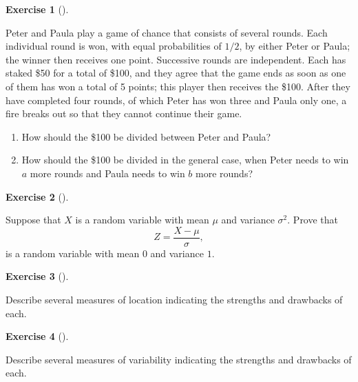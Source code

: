\documentclass[
  letterpaper,
  DIV=11,
  numbers=noendperiod]{scrreprt}
\providecommand{\tightlist}{%
  \setlength{\itemsep}{0pt}\setlength{\parskip}{0pt}}\usepackage{longtable,booktabs,array}
\theoremstyle{definition}
\newtheorem{exercise}{Exercise}[chapter]
\theoremstyle{definition}
\theoremstyle{definition}
\theoremstyle{remark}
\begin{document}
\begin{exercise}[]\protect\hypertarget{exr-6.5}{}\label{exr-6.5}

Peter and Paula play a game of chance that consists of several rounds.
Each individual round is won, with equal probabilities of \(1/2\), by
either Peter or Paula; the winner then receives one point. Successive
rounds are independent. Each has staked \$50 for a total of \$100, and
they agree that the game ends as soon as one of them has won a total of
5 points; this player then receives the \$100. After they have completed
four rounds, of which Peter has won three and Paula only one, a fire
breaks out so that they cannot continue their game.

\begin{enumerate}
\def\labelenumi{\alph{enumi}.}
\tightlist
\item
  How should the \$100 be divided between Peter and Paula?
\item
  How should the \$100 be divided in the general case, when Peter needs
  to win \(a\) more rounds and Paula needs to win \(b\) more rounds?
\end{enumerate}

\end{exercise}

\begin{exercise}[]\protect\hypertarget{exr-6.6}{}\label{exr-6.6}

Suppose that \(X\) is a random variable with mean \(\mu\) and variance
\(\sigma^2\). Prove that \[Z=\frac{X-\mu}{\sigma},\] is a random
variable with mean \(0\) and variance \(1\).

\end{exercise}

\begin{exercise}[]\protect\hypertarget{exr-6.7}{}\label{exr-6.7}

Describe several measures of location indicating the strengths and
drawbacks of each.

\end{exercise}

\begin{exercise}[]\protect\hypertarget{exr-6.8}{}\label{exr-6.8}

Describe several measures of variability indicating the strengths and
drawbacks of each.

\end{exercise}
\end{document}
